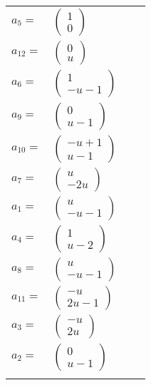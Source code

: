 \documentclass[1p]{elsarticle_modified}
\theoremstyle{definition}
\begin{document}
\begin{tabular}{m{7pt} m{180pt} m{7pt} m{180pt} }
\flushright $a_{5}=$&$\begin{pmatrix}1\\0\end{pmatrix}$ \\
\flushright $a_{12}=$&$\begin{pmatrix}0\\u\end{pmatrix}$ \\
\flushright $a_{6}=$&$\begin{pmatrix}1\\- u-1\end{pmatrix}$ \\
\flushright $a_{9}=$&$\begin{pmatrix}0\\u-1\end{pmatrix}$ \\
\flushright $a_{10}=$&$\begin{pmatrix}- u+1\\u-1\end{pmatrix}$ \\
\flushright $a_{7}=$&$\begin{pmatrix}u\\-2 u\end{pmatrix}$ \\
\flushright $a_{1}=$&$\begin{pmatrix}u\\- u-1\end{pmatrix}$ \\
\flushright $a_{4}=$&$\begin{pmatrix}1\\u-2\end{pmatrix}$ \\
\flushright $a_{8}=$&$\begin{pmatrix}u\\- u-1\end{pmatrix}$ \\
\flushright $a_{11}=$&$\begin{pmatrix}- u\\2 u-1\end{pmatrix}$ \\
\flushright $a_{3}=$&$\begin{pmatrix}- u\\2 u\end{pmatrix}$ \\
\flushright $a_{2}=$&$\begin{pmatrix}0\\u-1\end{pmatrix}$\\&\end{tabular}
\end{document}
